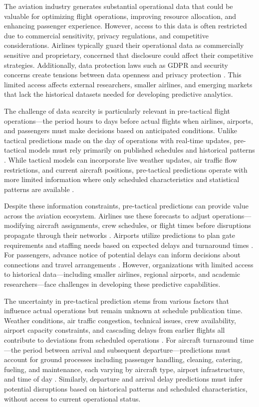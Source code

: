 \documentclass[conference]{IEEEtran}
\begin{document}
The aviation industry generates substantial operational data that could be valuable for optimizing flight operations, improving resource allocation, and enhancing passenger experience. However, access to this data is often restricted due to commercial sensitivity, privacy regulations, and competitive considerations. Airlines typically guard their operational data as commercially sensitive and proprietary, concerned that disclosure could affect their competitive strategies.%
Additionally, data protection laws such as GDPR and security concerns create tensions between data openness and privacy protection \cite{lei2025fedmeta}. This limited access affects external researchers, smaller airlines, and emerging markets that lack the historical datasets needed for developing predictive analytics.


The challenge of data scarcity is particularly relevant in pre-tactical flight operations—the period hours to days before actual flights when airlines, airports, and passengers must make decisions based on anticipated conditions. Unlike tactical predictions made on the day of operations with real-time updates, pre-tactical models must rely primarily on published schedules and historical patterns \cite{dalmau2024probabilistic}. While tactical models can incorporate live weather updates, air traffic flow restrictions, and current aircraft positions, pre-tactical predictions operate with more limited information where only scheduled characteristics and statistical patterns are available \cite{mas2022pre}.

Despite these information constraints, pre-tactical predictions can provide value across the aviation ecosystem. Airlines use these forecasts to adjust operations—modifying aircraft assignments, crew schedules, or flight times before disruptions propagate through their networks \cite{mas2022pre}. Airports utilize predictions to plan gate requirements and staffing needs based on expected delays and turnaround times \cite{de2023probabilistic}. For passengers, advance notice of potential delays can inform decisions about connections and travel arrangements \cite{carvalho2021relevance}. However, organizations with limited access to historical data—including smaller airlines, regional airports, and academic researchers—face challenges in developing these predictive capabilities.


The uncertainty in pre-tactical prediction stems from various factors that influence actual operations but remain unknown at schedule publication time. Weather conditions, air traffic congestion, technical issues, crew availability, airport capacity constraints, and cascading delays from earlier flights all contribute to deviations from scheduled operations \cite{carvalho2021relevance}. For aircraft turnaround time—the period between arrival and subsequent departure—predictions must account for ground processes including passenger handling, cleaning, catering, fueling, and maintenance, each varying by aircraft type, airport infrastructure, and time of day \cite{de2023probabilistic}. Similarly, departure and arrival delay predictions must infer potential disruptions based on historical patterns and scheduled characteristics, without access to current operational status.
\end{document}

